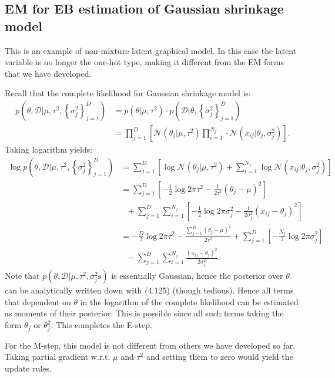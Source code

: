 \documentclass[UTF8]{ctexart}
\begin{document}
\subsection{EM for EB estimation of Gaussian shrinkage model}
This is an example of non-mixture latent graphical model.
In this case the latent variable is no longer the one-hot type, making it different from the EM forms that we have developed.

Recall that the complete likelihood for Gaussian shrinkage model is:
$$
\begin{aligned}
p\left(\theta,\mathcal{D}|\mu,\tau^{2},\left\{\sigma^{2}_{j}\right\}_{j=1}^{D}\right)&=p(\theta|\mu,\tau^{2})\cdot p\left(\mathcal{D}|\theta,\left\{\sigma^{2}_{j}\right\}_{j=1}^{D}\right)\\
&=\prod_{j=1}^{D}\left[\mathcal{N}(\theta_{j}|\mu,\tau^{2})\prod_{i=1}^{N_{j}}\cdot\mathcal{N}(x_{ij}|\theta_{j},\sigma^{2}_{j})\right].
\end{aligned}
$$
Taking logarithm yields:
$$
\begin{aligned}
\log p\left(\theta,\mathcal{D}|\mu,\tau^{2},\left\{\sigma^{2}_{j}\right\}_{j=1}^{D}\right)&=\sum_{j=1}^{D}\left[\log \mathcal{N}(\theta_{j}|\mu,\tau^{2})+\sum_{i=1}^{N_{j}}\log \mathcal{N}(x_{ij}|\theta_{j},\sigma^{2}_{j}) \right]\\
&=\sum_{j=1}^{D}\left[-\frac{1}{2}\log 2\pi\tau^{2}-\frac{1}{2\tau^{2}}(\theta_{j}-\mu)^{2}\right]\\
&\ \ \ +\sum_{j=1}^{D}\sum_{i=1}^{N_{j}}\left[-\frac{1}{2}\log 2\pi\sigma^{2}_{j}-\frac{1}{2\sigma^{2}_{j}}(x_{ij}-\theta_{j})^{2}\right]\\
&=-\frac{D}{2}\log 2\pi\tau^{2}-\frac{\sum_{j=1}^{D}(\theta_{j}-\mu)^{2}}{2\tau^{2}}+\sum_{j=1}^{D}\left[-\frac{N_{j}}{2}\log 2\pi\sigma^{2}_{j} \right]\\
&\ \ \ -\sum_{j=1}^{D}\sum_{i=1}^{N_{j}}\frac{(x_{ij}-\theta_{j})^{2}}{2\sigma^{2}_{j}}.
\end{aligned}
$$
Note that $p(\theta,\mathcal{D}|\mu,\tau^{2},\sigma^{2}_{j}\text{s})$ is essentially Gaussian, hence the posterior over $\theta$ can be analytically written down with (4.125) (though tedious).
Hence all terms that dependent on $\theta$ in the logarithm of the complete likelihood can be estimated as moments of their posterior.
This is possible since all such terms taking the form $\theta_{j}$ or $\theta_{j}^{2}$.
This completes the E-step.

For the M-step, this model is not different from others we have developed so far.
Taking partial gradient w.r.t. $\mu$ and $\tau^{2}$ and setting them to zero would yield the update rules.
\end{document}

